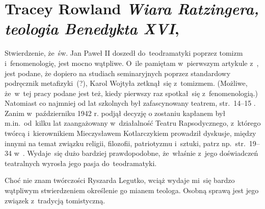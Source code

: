 \documentclass[a4paper,11pt]{article}
\numberwithin{equation}{section}
\begin{document}
\section{Tracey Rowland \textit{Wiara Ratzingera, teologia
    Benedykta XVI}, \parencite{RowlandWiaraRatzingera2010}}

\vspace{0em}



\vspace{0em}


\noindent
{} Stwierdzenie, że~św. Jan Paweł II doszedł do~teodramatyki poprzez
tomizm i~fenomenologię, jest mocno wątpliwe. O~ile pamiętam w~pierwszym
artykule z~\cite{PoslugaMysleniaVolIX2011}, jest podane, że dopiero na
studiach seminaryjnych poprzez standardowy podręcznik metafizyki~(?), Karol
Wojtyła zetknął~się z~tomizmem. (Możliwe, że~w~tej pracy podane jest też,
kiedy pierwszy raz spotkał~się z~fenomenologią.) Natomiast co najmniej od
lat szkolnych był zafascynowany teatrem, str.~14--15
\cite{NowakJanPawelIIKronikaZyciaIPontyfikatu2015}. Zanim w~październiku
1942 r. podjął decyzję o zostaniu kapłanem był m.in.~od~kilku lat
zaangażowany w~działalność Teatru Rapsodycznego, z~którego twórcą
i~kierownikiem Mieczysławem Kotlarczykiem prowadził dyskusje, między innymi
na temat związku religii, filozofii, patriotyzmu i~sztuki, patrz
np.~str.~19--34 w~\cite{NowakJanPawelIIKronikaZyciaIPontyfikatu2015}.
Wydaje~się dużo bardziej prawdopodobne, że~właśnie z~jego doświadczeń
teatralnych wyrosła jego pasja do~teodramatyki.

\VerSpaceFour





\noindent
{} Choć nie znam twórczości Ryszarda Legutko, wciąż
wydaje mi~się bardzo wątpliwym stwierdzeniem określenie go mianem
teologa. Osobną sprawą jest jego związek z~tradycją tomistyczną.






\end{document}
